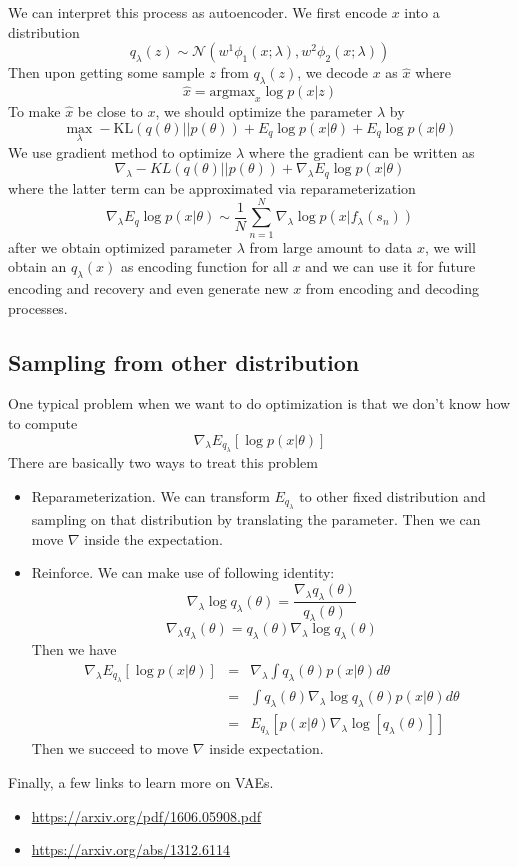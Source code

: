 \documentclass{article}
\begin{document}
We can interpret this process as autoencoder. We first encode $x$ into a distribution $$q_{\lambda}(z) \sim \mathcal{N}(w^1\phi_1(x; \lambda), w^2\phi_2(x; \lambda))$$
Then upon getting some sample $z$ from $q_\lambda(z)$, we decode $x$ as $\hat{x}$ where
$$ \hat{x} = \textrm{argmax}_{x}\log p(x|z) $$
To make $\hat{x}$ be close to $x$, we should optimize the parameter $\lambda$ by
$$ \max_\lambda -\textrm{KL}(q(\theta) || p(\theta)) + E_q\log p(x|\theta) + E_q \log p(x|\theta)$$
We use gradient method to optimize $\lambda$ where the gradient can be written as
$$ \nabla_{\lambda} -KL(q(\theta) || p(\theta)) + \nabla_{\lambda} E_q\log p(x|\theta) $$
where the latter term can be approximated via reparameterization
$$ \nabla_{\lambda} E_q\log p(x | \theta) \sim \frac{1}{N}\sum_{n=1}^N\nabla_{\lambda} \log p(x | f_\lambda(s_n)) $$
after we obtain optimized parameter $\lambda$ from large amount to data $x$, we will obtain an $q_{\lambda}(x)$ as encoding function for all $x$ and we can use it for future encoding and recovery and even generate new $x$ from encoding and decoding processes. 

\subsection{Sampling from other distribution}
One typical problem when we want to do optimization is that we don't know how to compute 
$$ \nabla_{\lambda} E_{q_{\lambda}}[\log p(x | \theta)] $$
There are basically two ways to treat this problem
\begin{itemize}
\item Reparameterization. We can transform $E_{q_{\lambda}}$ to other fixed distribution and sampling on that distribution by translating the parameter. Then we can move $\nabla$ inside the expectation. 
\item Reinforce. We can make use of following identity:
$$ \nabla_{\lambda}\log q_{\lambda}(\theta) = \frac{\nabla_{\lambda}q_{\lambda}(\theta)}{q_{\lambda}(\theta)} $$
$$ \nabla_{\lambda}q_{\lambda}(\theta) = q_{\lambda}(\theta)\nabla_{\lambda}\log q_{\lambda}(\theta) $$
Then we have
\begin{eqnarray}
\nabla_{\lambda}E_{q_\lambda}[\log p(x | \theta)] & = & \nabla_{\lambda}\int q_{\lambda}(\theta)p(x|\theta)d\theta \\
& = & \int q_{\lambda}(\theta) \nabla_{\lambda}\log q_{\lambda}(\theta) p(x | \theta)d\theta \\
& = & E_{q_\lambda}[p(x|\theta)\nabla_\lambda \log[q_\lambda(\theta)]]
\end{eqnarray}
Then we succeed to move $\nabla$ inside expectation.
\end{itemize}

Finally, a few links to learn more on VAEs.
\begin{itemize}
    \item \url{https://arxiv.org/pdf/1606.05908.pdf}
    \item \url{https://arxiv.org/abs/1312.6114}
\end{itemize}
\end{document}
